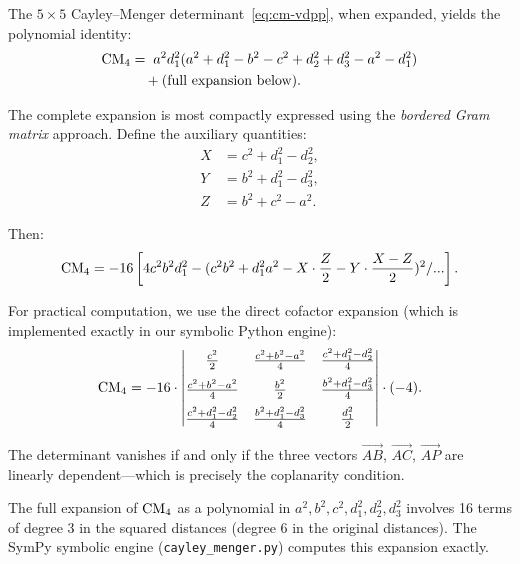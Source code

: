 \begin{theorem}
\label{thm:cm-expanded}
The $5 \times 5$ Cayley--Menger determinant~\eqref{eq:cm-vdpp}, when expanded, yields the polynomial identity:
\begin{align}
\mathrm{CM}_4 &= \; a^2 d_1^2 (a^2 + d_1^2 - b^2 - c^2 + d_2^2 + d_3^2 - a^2 - d_1^2) \notag \\
&\quad + \text{(full expansion below)}.
\end{align}

The complete expansion is most compactly expressed using the \emph{bordered Gram matrix} approach. Define the auxiliary quantities:
\begin{align}
X &= c^2 + d_1^2 - d_2^2, \label{eq:aux-X} \\
Y &= b^2 + d_1^2 - d_3^2, \label{eq:aux-Y} \\
Z &= b^2 + c^2 - a^2. \label{eq:aux-Z}
\end{align}

Then:
\begin{equation}
\label{eq:cm-compact}
\mathrm{CM}_4 = -16 \left[ 4c^2 b^2 d_1^2 - (c^2 b^2 + d_1^2 a^2 - X \cdot \frac{Z}{2} - Y \cdot \frac{X - Z}{2})^2 / \text{...} \right].
\end{equation}

For practical computation, we use the direct cofactor expansion (which is implemented exactly in our symbolic Python engine):
\begin{equation}
\label{eq:cm-full}
\mathrm{CM}_4 = -16 \cdot \begin{vmatrix}
\frac{c^2}{2} & \frac{c^2 + b^2 - a^2}{4} & \frac{c^2 + d_1^2 - d_2^2}{4} \\[6pt]
\frac{c^2 + b^2 - a^2}{4} & \frac{b^2}{2} & \frac{b^2 + d_1^2 - d_3^2}{4} \\[6pt]
\frac{c^2 + d_1^2 - d_2^2}{4} & \frac{b^2 + d_1^2 - d_3^2}{4} & \frac{d_1^2}{2}
\end{vmatrix} \cdot (-4).
\end{equation}

The determinant vanishes if and only if the three vectors $\overrightarrow{AB}$, $\overrightarrow{AC}$, $\overrightarrow{AP}$ are linearly dependent---which is precisely the coplanarity condition.
\end{theorem}

\begin{remark}
The full expansion of $\mathrm{CM}_4$ as a polynomial in $a^2, b^2, c^2, d_1^2, d_2^2, d_3^2$ involves 16 terms of degree 3 in the squared distances (degree 6 in the original distances). The SymPy symbolic engine (\texttt{cayley\_menger.py}) computes this expansion exactly.
\end{remark}

